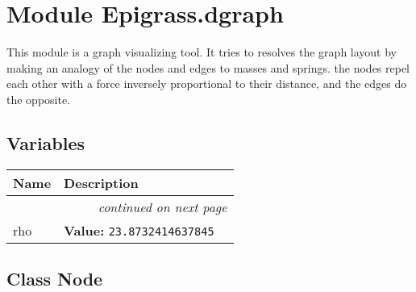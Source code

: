 %
%
%


\section{Module Epigrass.dgraph}

    \label{Epigrass:dgraph}
This module is a graph visualizing tool. It tries to resolves the graph 
layout by making an analogy of the nodes and edges to masses and springs. 
the nodes repel each other with a force inversely proportional to their 
distance, and the edges do the opposite.



  \subsection{Variables}

\begin{longtable}{|p{}|p{}|l}
\cline{1-2}
\cline{1-2} \centering \textbf{Name} & \centering \textbf{Description}& \\
\cline{1-2}
\endhead\cline{1-2}\multicolumn{3}{r}{\small\textit{continued on next page}}\\\endfoot\cline{1-2}
\endlastfoot\raggedright r\-h\-o\- & \raggedright \textbf{Value:} 
{\tt 23.8732414637845}&\\
\cline{1-2}
\end{longtable}



\subsection{Class Node}

